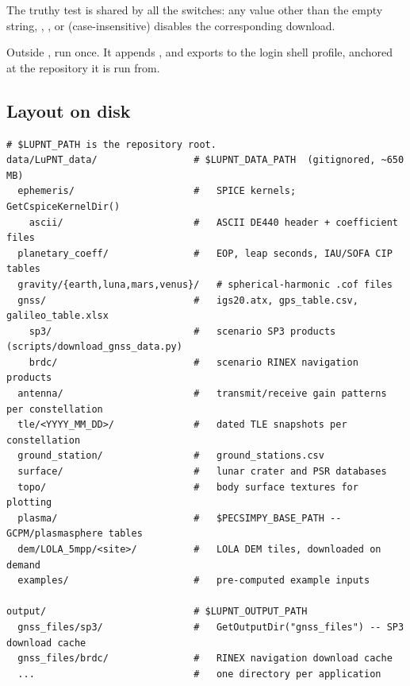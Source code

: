 The truthy test is shared by all the  switches: any value
other than the empty string, , ,  or 
(case-insensitive) disables the corresponding download.

\begin{lupntnote}
Outside , run  once. It appends
,  and 
exports to the login shell profile, anchored at the repository it is run from.
\end{lupntnote}

\subsection{Layout on disk}
\label{sec:sp3-layout}

\begin{lstlisting}[language=shell, caption={The reference-data tree and the run-time cache.}, label={lst:sp3-tree}]
# $LUPNT_PATH is the repository root.
data/LuPNT_data/                 # $LUPNT_DATA_PATH  (gitignored, ~650 MB)
  ephemeris/                     #   SPICE kernels; GetCspiceKernelDir()
    ascii/                       #   ASCII DE440 header + coefficient files
  planetary_coeff/               #   EOP, leap seconds, IAU/SOFA CIP tables
  gravity/{earth,luna,mars,venus}/   # spherical-harmonic .cof files
  gnss/                          #   igs20.atx, gps_table.csv, galileo_table.xlsx
    sp3/                         #   scenario SP3 products (scripts/download_gnss_data.py)
    brdc/                        #   scenario RINEX navigation products
  antenna/                       #   transmit/receive gain patterns per constellation
  tle/<YYYY_MM_DD>/              #   dated TLE snapshots per constellation
  ground_station/                #   ground_stations.csv
  surface/                       #   lunar crater and PSR databases
  topo/                          #   body surface textures for plotting
  plasma/                        #   $PECSIMPY_BASE_PATH -- GCPM/plasmasphere tables
  dem/LOLA_5mpp/<site>/          #   LOLA DEM tiles, downloaded on demand
  examples/                      #   pre-computed example inputs

output/                          # $LUPNT_OUTPUT_PATH
  gnss_files/sp3/                #   GetOutputDir("gnss_files") -- SP3 download cache
  gnss_files/brdc/               #   RINEX navigation download cache
  ...                            #   one directory per application
\end{lstlisting}

